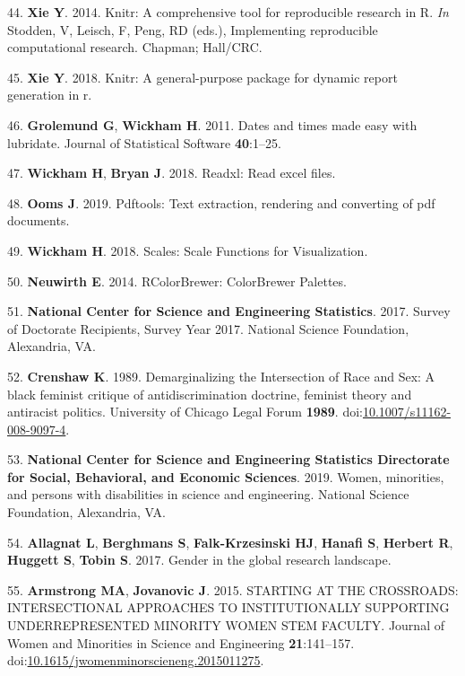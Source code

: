 \documentclass[10pt,]{article}
\begin{document}
\hypertarget{ref-knitr_2014}{}
44. \textbf{Xie Y}. 2014. Knitr: A comprehensive tool for reproducible
research in R. \emph{In} Stodden, V, Leisch, F, Peng, RD (eds.),
Implementing reproducible computational research. Chapman; Hall/CRC.

\hypertarget{ref-knitr_2018}{}
45. \textbf{Xie Y}. 2018. Knitr: A general-purpose package for dynamic
report generation in r.

\hypertarget{ref-lubridate}{}
46. \textbf{Grolemund G}, \textbf{Wickham H}. 2011. Dates and times made
easy with lubridate. Journal of Statistical Software \textbf{40}:1--25.

\hypertarget{ref-readxl}{}
47. \textbf{Wickham H}, \textbf{Bryan J}. 2018. Readxl: Read excel
files.

\hypertarget{ref-pdftools}{}
48. \textbf{Ooms J}. 2019. Pdftools: Text extraction, rendering and
converting of pdf documents.

\hypertarget{ref-wickham_scales_2018}{}
49. \textbf{Wickham H}. 2018. Scales: Scale Functions for Visualization.

\hypertarget{ref-neuwirth_rcolorbrewer_2014}{}
50. \textbf{Neuwirth E}. 2014. RColorBrewer: ColorBrewer Palettes.

\hypertarget{ref-nsf_survey_2017}{}
51. \textbf{National Center for Science and Engineering Statistics}.
2017. Survey of Doctorate Recipients, Survey Year 2017. National Science
Foundation, Alexandria, VA.

\hypertarget{ref-Crenshaw1989}{}
52. \textbf{Crenshaw K}. 1989. Demarginalizing the Intersection of Race
and Sex: A black feminist critique of antidiscrimination doctrine,
feminist theory and antiracist politics. University of Chicago Legal
Forum \textbf{1989}.
doi:\href{https://doi.org/10.1007/s11162-008-9097-4}{10.1007/s11162-008-9097-4}.

\hypertarget{ref-nsf_2019}{}
53. \textbf{National Center for Science and Engineering Statistics
Directorate for Social, Behavioral, and Economic Sciences}. 2019. Women,
minorities, and persons with disabilities in science and engineering.
National Science Foundation, Alexandria, VA.

\hypertarget{ref-allagnat_gender_2017}{}
54. \textbf{Allagnat L}, \textbf{Berghmans S}, \textbf{Falk-Krzesinski
HJ}, \textbf{Hanafi S}, \textbf{Herbert R}, \textbf{Huggett S},
\textbf{Tobin S}. 2017. Gender in the global research landscape.

\hypertarget{ref-Armstrong2015}{}
55. \textbf{Armstrong MA}, \textbf{Jovanovic J}. 2015. STARTING AT THE
CROSSROADS: INTERSECTIONAL APPROACHES TO INSTITUTIONALLY SUPPORTING
UNDERREPRESENTED MINORITY WOMEN STEM FACULTY. Journal of Women and
Minorities in Science and Engineering \textbf{21}:141--157.
doi:\href{https://doi.org/10.1615/jwomenminorscieneng.2015011275}{10.1615/jwomenminorscieneng.2015011275}.
\end{document}

